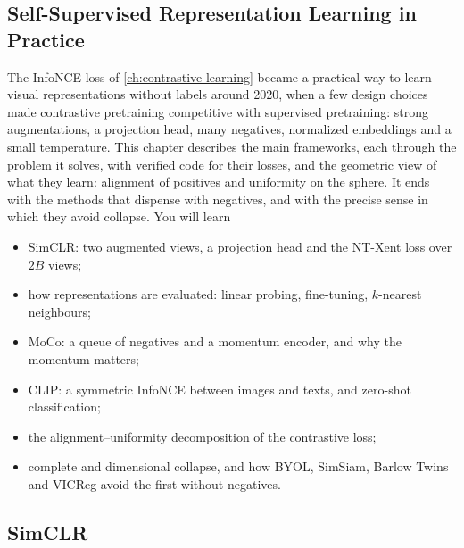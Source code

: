 \begin{notechapter}
\chapter{Self-Supervised Representation Learning in Practice}\label{ch:contrastive-practice}

\begin{chapterintro}
The InfoNCE loss of \cref{ch:contrastive-learning} became a practical way to learn visual
representations without labels around 2020, when a few design choices made contrastive
pretraining competitive with supervised pretraining: strong augmentations, a projection
head, many negatives, normalized embeddings and a small temperature. This chapter
describes the main frameworks, each through the problem it solves, with verified code for
their losses, and the geometric view of what they learn: alignment of positives and uniformity
on the sphere. It ends with the methods that dispense with negatives, and with the precise
sense in which they avoid collapse. You will learn
\begin{itemize}[nosep]
  \item SimCLR: two augmented views, a projection head and the NT-Xent loss over $2B$ views;
  \item how representations are evaluated: linear probing, fine-tuning, $k$-nearest neighbours;
  \item MoCo: a queue of negatives and a momentum encoder, and why the momentum matters;
  \item CLIP: a symmetric InfoNCE between images and texts, and zero-shot classification;
  \item the alignment--uniformity decomposition of the contrastive loss;
  \item complete and dimensional collapse, and how BYOL, SimSiam, Barlow Twins and VICReg avoid
        the first without negatives.
\end{itemize}
\end{chapterintro}

\section{SimCLR}\label{contrastive-practice:sec:simclr}


\end{notechapter}
